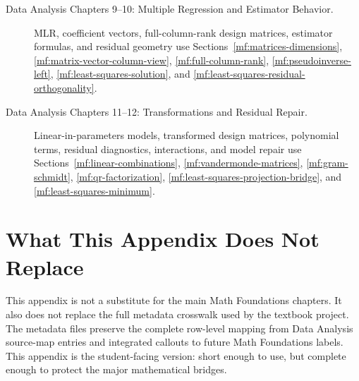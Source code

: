 \begin{description}
    \item[Data Analysis Chapters 9--10: Multiple Regression and Estimator Behavior.] MLR, coefficient vectors, full-column-rank design matrices, estimator formulas, and residual geometry use Sections~\ref{mf:matrices-dimensions}, \ref{mf:matrix-vector-column-view}, \ref{mf:full-column-rank}, \ref{mf:pseudoinverse-left}, \ref{mf:least-squares-solution}, and \ref{mf:least-squares-residual-orthogonality}.

    \item[Data Analysis Chapters 11--12: Transformations and Residual Repair.] Linear-in-parameters models, transformed design matrices, polynomial terms, residual diagnostics, interactions, and model repair use Sections~\ref{mf:linear-combinations}, \ref{mf:vandermonde-matrices}, \ref{mf:gram-schmidt}, \ref{mf:qr-factorization}, \ref{mf:least-squares-projection-bridge}, and \ref{mf:least-squares-minimum}.
\end{description}

\section{What This Appendix Does Not Replace}
\label{mf:da-bridge-not-a-replacement}

This appendix is not a substitute for the main Math Foundations chapters. It also does not replace the full metadata crosswalk used by the textbook project. The metadata files preserve the complete row-level mapping from Data Analysis source-map entries and integrated callouts to future Math Foundations labels. This appendix is the student-facing version: short enough to use, but complete enough to protect the major mathematical bridges.

\endgroup
